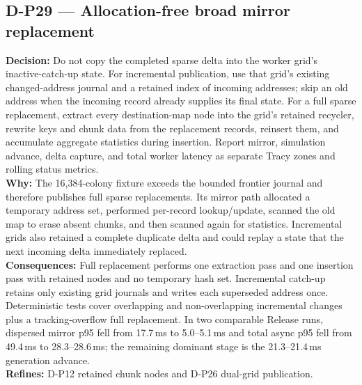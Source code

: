 \subsection*{D-P29 --- Allocation-free broad mirror replacement}
\begin{decisionbox}[title={D-P29 \quad 2026-08-11}]
\textbf{Decision:} Do not copy the completed sparse delta into the worker
grid's inactive-catch-up state. For incremental publication, use that grid's
existing changed-address journal and a retained index of incoming addresses;
skip an old address when the incoming record already supplies its final state.
For a full sparse replacement, extract every destination-map node into the
grid's retained recycler, rewrite keys and chunk data from the replacement
records, reinsert them, and accumulate aggregate statistics during insertion.
Report mirror, simulation advance, delta capture, and total worker latency as
separate Tracy zones and rolling status metrics.\\
\textbf{Why:} The 16,384-colony fixture exceeds the bounded frontier journal
and therefore publishes full sparse replacements. Its mirror path allocated a
temporary address set, performed per-record lookup/update, scanned the old map
to erase absent chunks, and then scanned again for statistics. Incremental
grids also retained a complete duplicate delta and could replay a state that
the next incoming delta immediately replaced.\\
\textbf{Consequences:} Full replacement performs one extraction pass and one
insertion pass with retained nodes and no temporary hash set. Incremental
catch-up retains only existing grid journals and writes each superseded address
once. Deterministic tests cover overlapping and non-overlapping incremental
changes plus a tracking-overflow full replacement. In two comparable
Release runs, dispersed mirror p95 fell from 17.7\,ms to 5.0--5.1\,ms and total
async p95 fell from 49.4\,ms to 28.3--28.6\,ms; the remaining dominant stage is
the 21.3--21.4\,ms generation advance.\\
\textbf{Refines:} D-P12 retained chunk nodes and D-P26 dual-grid publication.
\end{decisionbox}

